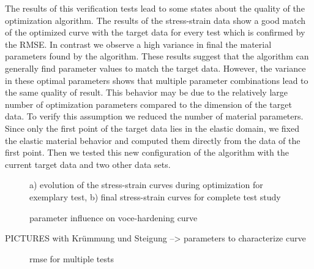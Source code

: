     The results of this verification tests lead to some states about the quality of the optimization algorithm. The results of the stress-strain data show a good match of the optimized curve with the target data for every test which is confirmed by the RMSE. In contrast we observe a high variance in final the material parameters found by the algorithm. These results suggest that the algorithm can generally find parameter values to match the target data. However, the variance in these optimal parameters shows that multiple parameter combinations lead to the same quality of result. This behavior may be due to the relatively large number of optimization parameters compared to the dimension of the target data. To verify this assumption we reduced the number of material parameters. Since only the first point of the target data lies in the elastic domain, we fixed the elastic material behavior and computed them directly from the data of the first point. Then we tested this new configuration of the algorithm with the current target data and two other data sets.


    \begin{figure}[H]
        \centering
        \caption{a) evolution of the stress-strain curves during optimization for exemplary test, b) final stress-strain curves for complete test study}
        \label{fig:complete}
    \end{figure}


   
   \begin{figure}
		\centering
		\def\svgwidth{0.5\textwidth}
        
		\caption{parameter influence on voce-hardening curve}
		\label{fig:Parameter influence on VOCE-hardening curve}
	\end{figure}
    PICTURES with Krümmung und Steigung --> parameters to characterize curve

    \begin{figure}[H]
		\centering
		\def\svgwidth{0.7\textwidth}
        
		\caption{rmse for multiple tests}
		\label{fig:rmse progress}
	\end{figure}

